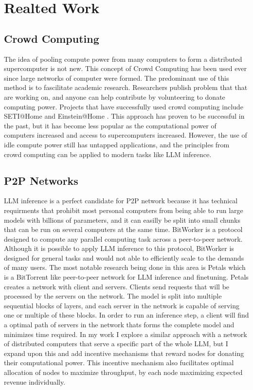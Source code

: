 \documentclass[preprint,twoside,11pt]{article}
\begin{document}
\section{Realted Work}

\subsection{Crowd Computing}

The idea of pooling compute power from many computers to form a distributed supercomputer is not new. This concept of Crowd Computing
has been used ever since large networks of computer were formed. The predominant use of this method is to fascilitate academic research.
Researchers publish problem that that are working on, and anyone can help contribute by volunteering to donate computing power.
Projects that have successfully used crowd computing include SETI@Home \citep{10.1145/581571.581573} and Einstein@Home \citep{Steltner_2021}.
This approach has proven to be successful in the past, but it has become less popular as the computational power of computers increased and access to supercomputers increased.
However, the use of idle compute power still has untapped applications, and the principles from crowd computing can be applied to modern tasks like LLM inference.

\subsection{P2P Networks}

LLM inference is a perfect candidate for P2P network because it has technical requirments that prohibit most personal computers from being able to run
large models with billions of parameters, and it can easilly be split into small chunks that can be run on several computers at the same time. BitWorker \citep{Durand_Gasparyan_Rouvinez_Aad_Braun_Trinh_2015} is a protocol designed to compute any parallel computing task across a peer-to-peer network.
Although it is possible to apply LLM inference to this protocol, BitWorker is designed for general tasks and would not able to efficiently scale to the demands of many users.
The most notable research being done in this area is Petals \citep{borzunov2023petalscollaborativeinferencefinetuning} which is a BitTorrent like peer-to-peer network for LLM inference and finetuning.
Petals creates a network with client and servers. Clients send requests that will be processed by the servers on the network. The model is split into multiple sequential blocks of layers, and each server
in the network is capable of serving one or multiple of these blocks. In order to run an inference step, a client will find a optimal path of servers
in the network thats forms the complete model and minimizes time required. In my work I explore a similar approach with a network of distributed computers that serve a specific part of the whole LLM,
but I expand upon this and add incentive mechanisms that reward nodes for donating their computational power. This incentive mechanism also fucilitates optimal allocation of nodes to maximize throughput, by each
node maximizing expected revenue individually.
\end{document}
